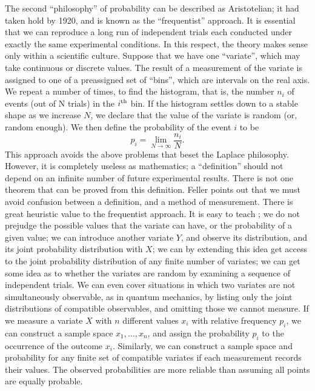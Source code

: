 \documentclass[12pt]{article}
\begin{document}
The second ``philosophy'' of probability can be described as Aristotelian;
it had taken hold by 1920, and is known as the
``frequentist'' approach. It is essential that we can reproduce a long run
of independent trials each conducted under exactly the same experimental
conditions. In this respect, the theory makes sense only within a
scientific culture. Suppose that we have one
``variate'', which may take continuous or discrete values. The result
of a measurement of the variate is assigned to one of a
preassigned set of ``bins'', which are intervals on the real axis.
We repeat a number of times, to find the histogram, that is, the number
$n_i$ of
events (out of N trials) in the $i^{\rm th}$ bin. If the histogram settles
down to a stable shape as we increase $N$, we declare that the value of the
variate is random (or, random enough). We then define the probability of
the event $i$ to be
\begin{equation}
p_i=\lim_{N\rightarrow\infty}\frac{n_i}{N}.
\end{equation}
This approach avoids the above problems that beset the Laplace philosophy.
However, it is completely useless as mathematics; a ``definition''
should not depend on an infinite number of future experimental results.
There is not one theorem that can be
proved from this definition. Feller points out that we must avoid
confusion between a definition, and a method of measurement.
There is great heuristic value to the frequentist approach.
It is easy to teach \cite{Decker};
we do not prejudge the possible values that the variate
can have, or the probability of a given value; we can
introduce another variate $Y$, and observe its distribution, and its
joint probability distribution with $X$;
we can by extending this idea get access to the
joint probability distribution of any finite number of variates;
we can get some idea as to whether the variates
are random by examining a sequence of independent trials. We can even cover
situations in which two variates are not simultaneously observable, as in
quantum mechanics, by listing only the joint distributions of compatible
observables, and omitting those we cannot measure.
If we measure a variate $X$ with $n$ different values $x_i$ with relative
frequency $p_i$, we can construct a sample space $x_1,\ldots,x_n$, and
assign the probability $p_i$ to the occurrence of the outcome $x_i$.
Similarly, we can construct a sample space and probability for any
finite set of compatible variates if each measurement records their
values. The observed probabilities are more reliable than assuming all
points are equally probable.
\end{document}
